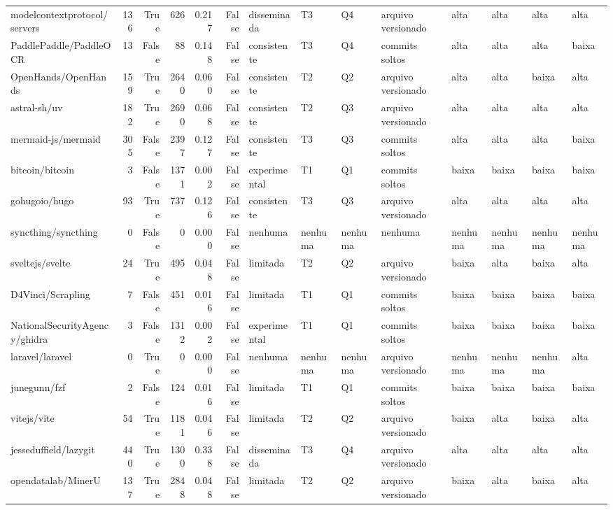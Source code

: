 \begin{tabular}{lrrrrrllllllll}
modelcontextprotocol/servers & 136 & True & 626 & 0.217 & False & disseminada & T3 & Q4 & arquivo versionado & alta & alta & alta & alta \\
PaddlePaddle/PaddleOCR & 13 & False & 88 & 0.148 & False & consistente & T3 & Q4 & commits soltos & alta & alta & alta & baixa \\
OpenHands/OpenHands & 159 & True & 2640 & 0.060 & False & consistente & T2 & Q2 & arquivo versionado & alta & alta & baixa & alta \\
astral-sh/uv & 182 & True & 2690 & 0.068 & False & consistente & T2 & Q3 & arquivo versionado & alta & alta & alta & alta \\
mermaid-js/mermaid & 305 & False & 2397 & 0.127 & False & consistente & T3 & Q3 & commits soltos & alta & alta & alta & baixa \\
bitcoin/bitcoin & 3 & False & 1371 & 0.002 & False & experimental & T1 & Q1 & commits soltos & baixa & baixa & baixa & baixa \\
gohugoio/hugo & 93 & True & 737 & 0.126 & False & consistente & T3 & Q3 & arquivo versionado & alta & alta & alta & alta \\
syncthing/syncthing & 0 & False & 0 & 0.000 & False & nenhuma & nenhuma & nenhuma & nenhuma & nenhuma & nenhuma & nenhuma & nenhuma \\
sveltejs/svelte & 24 & True & 495 & 0.048 & False & limitada & T2 & Q2 & arquivo versionado & baixa & alta & baixa & alta \\
D4Vinci/Scrapling & 7 & False & 451 & 0.016 & False & limitada & T1 & Q1 & commits soltos & baixa & baixa & baixa & baixa \\
NationalSecurityAgency/ghidra & 3 & False & 1312 & 0.002 & False & experimental & T1 & Q1 & commits soltos & baixa & baixa & baixa & baixa \\
laravel/laravel & 0 & True & 0 & 0.000 & False & nenhuma & nenhuma & nenhuma & arquivo versionado & nenhuma & nenhuma & nenhuma & alta \\
junegunn/fzf & 2 & False & 124 & 0.016 & False & limitada & T1 & Q1 & commits soltos & baixa & baixa & baixa & baixa \\
vitejs/vite & 54 & True & 1181 & 0.046 & False & limitada & T2 & Q2 & arquivo versionado & baixa & alta & baixa & alta \\
jesseduffield/lazygit & 440 & True & 1300 & 0.338 & False & disseminada & T3 & Q4 & arquivo versionado & alta & alta & alta & alta \\
opendatalab/MinerU & 137 & True & 2848 & 0.048 & False & limitada & T2 & Q2 & arquivo versionado & baixa & alta & baixa & alta \\

\end{tabular}
